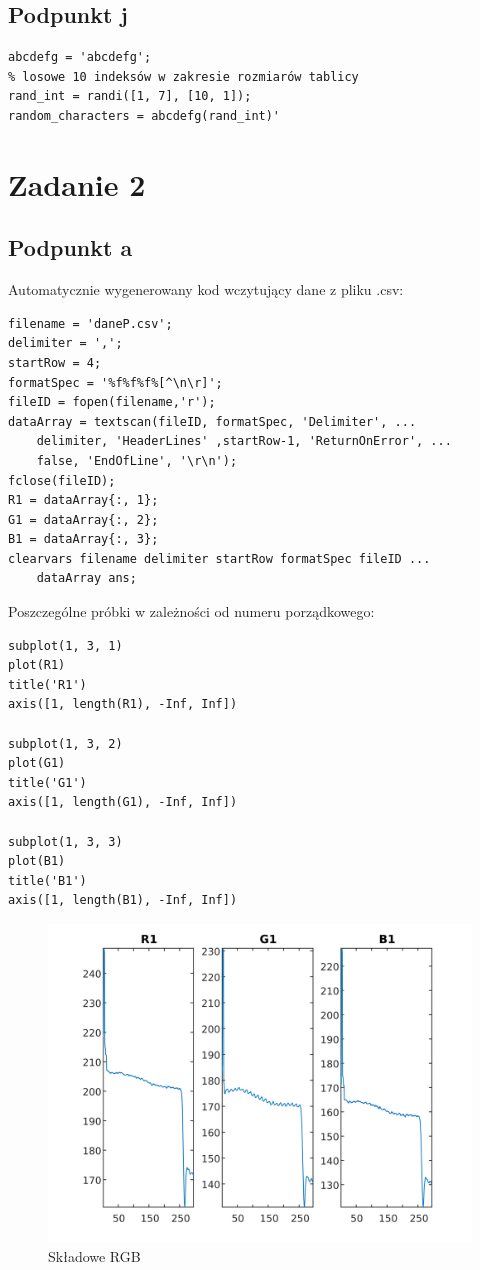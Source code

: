 \documentclass[a4paper, 12pt, titlepage]{article}
\begin{document}
        \subsection{Podpunkt j}
\begin{lstlisting}
abcdefg = 'abcdefg';
% losowe 10 indeksów w zakresie rozmiarów tablicy
rand_int = randi([1, 7], [10, 1]); 
random_characters = abcdefg(rand_int)'
\end{lstlisting}
    
    \section{Zadanie 2}
        \subsection{Podpunkt a}
            Automatycznie wygenerowany kod wczytujący dane z pliku 
            .csv:
\begin{lstlisting}
filename = 'daneP.csv';
delimiter = ',';
startRow = 4;
formatSpec = '%f%f%f%[^\n\r]';
fileID = fopen(filename,'r');
dataArray = textscan(fileID, formatSpec, 'Delimiter', ...
    delimiter, 'HeaderLines' ,startRow-1, 'ReturnOnError', ...
    false, 'EndOfLine', '\r\n');
fclose(fileID);
R1 = dataArray{:, 1};
G1 = dataArray{:, 2};
B1 = dataArray{:, 3};
clearvars filename delimiter startRow formatSpec fileID ...
    dataArray ans;
\end{lstlisting}
    Poszczególne próbki w zależności od numeru porządkowego:
\begin{lstlisting}
subplot(1, 3, 1)
plot(R1)
title('R1')
axis([1, length(R1), -Inf, Inf])

subplot(1, 3, 2)
plot(G1)
title('G1')
axis([1, length(G1), -Inf, Inf])

subplot(1, 3, 3)
plot(B1)
title('B1')
axis([1, length(B1), -Inf, Inf])
\end{lstlisting}
            \begin{figure}[H]
                \centering
                \includegraphics[width=0.8\columnwidth]{read.png}
                \caption{Składowe RGB}
            \end{figure}\noindent
\end{document}
